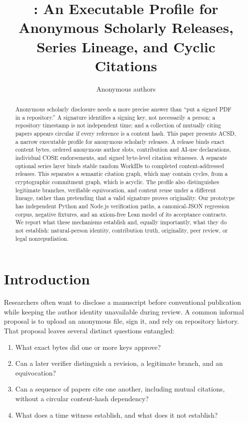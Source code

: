 \documentclass[11pt]{article}
\title{\acsd: An Executable Profile for Anonymous Scholarly Releases,\\ Series Lineage, and Cyclic Citations}
\author{Anonymous authors}
\date{}
\newcommand{\workid}{\textsf{WorkID}}
\newcommand{\acsd}{\textsc{ACSD}}
\begin{document}
\maketitle

\begin{abstract}
Anonymous scholarly disclosure needs a more precise answer than ``put a signed PDF in a repository.'' A signature identifies a signing key, not necessarily a person; a repository timestamp is not independent time; and a collection of mutually citing papers appears circular if every reference is a content hash. This paper presents \acsd, a narrow executable profile for anonymous scholarly releases. A release binds exact content bytes, ordered anonymous author slots, contribution and AI-use declarations, individual COSE endorsements, and signed byte-level citation witnesses. A separate optional series layer binds stable random \workid s to completed content-addressed releases. This separates a semantic citation graph, which may contain cycles, from a cryptographic commitment graph, which is acyclic. The profile also distinguishes legitimate branches, verifiable equivocation, and content reuse under a different lineage, rather than pretending that a valid signature proves originality. Our prototype has independent Python and Node.js verification paths, a canonical-JSON regression corpus, negative fixtures, and an axiom-free Lean model of its acceptance contracts. We report what these mechanisms establish and, equally importantly, what they do not establish: natural-person identity, contribution truth, originality, peer review, or legal nonrepudiation.
\end{abstract}

\section{Introduction}

Researchers often want to disclose a manuscript before conventional publication while keeping the author identity unavailable during review. A common informal proposal is to upload an anonymous file, sign it, and rely on repository history. That proposal leaves several distinct questions entangled:

\begin{enumerate}
  \item What exact bytes did one or more keys approve?
  \item Can a later verifier distinguish a revision, a legitimate branch, and an equivocation?
  \item Can a sequence of papers cite one another, including mutual citations, without a circular content-hash dependency?
  \item What does a time witness establish, and what does it not establish?
\end{enumerate}
\end{document}
